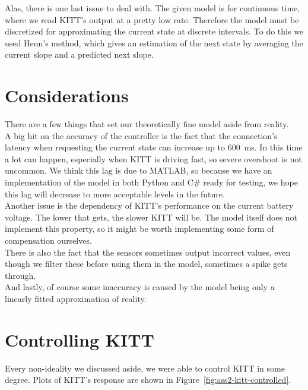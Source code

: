 \documentclass[11pt,titlepage]{report}
\begin{document}
Alas, there is one last issue to deal with. The given model is for continuous time, where we read KITT's output at a pretty low rate. Therefore the model must be discretized for approximating the current state at discrete intervals. To do this we used Heun's method, which gives an estimation of the next state by averaging the current slope and a predicted next slope. \cite{wikipedia-heuns}

\section{Considerations}
There are a few things that set our theoretically fine model aside from reality. \\
A big hit on the accuracy of the controller is the fact that the connection's latency when requesting the current state can increase up to \SI{600}{ms}. In this time a lot can happen, especially when KITT is driving fast, so severe overshoot is not uncommon. We think this lag is due to MATLAB, so because we have an implementation of the model in both Python and C\# ready for testing, we hope this lag will decrease to more acceptable levels in the future. \\
Another issue is the dependency of KITT's performance on the current battery voltage. The lower that gets, the slower KITT will be. The model itself does not implement this property, so it might be worth implementing some form of compensation ourselves. \\
There is also the fact that the sensors sometimes output incorrect values, even though we filter these before using them in the model, sometimes a spike gets through. \\
And lastly, of course some inaccuracy is caused by the model being only a linearly fitted approximation of reality. \\

\section{Controlling KITT}
Every non-ideality we discussed aside, we were able to control KITT in some degree. Plots of KITT's response are shown in Figure~\ref{fig:ass2-kitt-controlled}.
\end{document}
